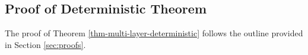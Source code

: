 \documentclass[11pt]{article}
\newcommand{\tran}{t}
\newcommand{\blue}[1]{{\color{blue} #1}}
\newcommand{\Aplus}[1]{A_{+, #1}}
\newcommand{\Apx}{\Aplus{x}}
\newcommand{\Apy}{\Aplus{y}}
\newcommand{\Apxt}{\Apx^\tran}
\newcommand{\CtC}{\blue{C^\tran C}}
\newcommand{\Bpx}{B_{+, x}}
\newcommand{\Bpxt}{B_{+, x}^\tran}
\newcommand{\Bpy}{B_{+, y}}
\begin{document}

\subsection{Proof of Deterministic Theorem} \label{sec:deterministic-theorem}

The proof of Theorem \ref{thm-multi-layer-deterministic} follows the outline provided in Section \ref{sec:proofs}.  
\end{document}
